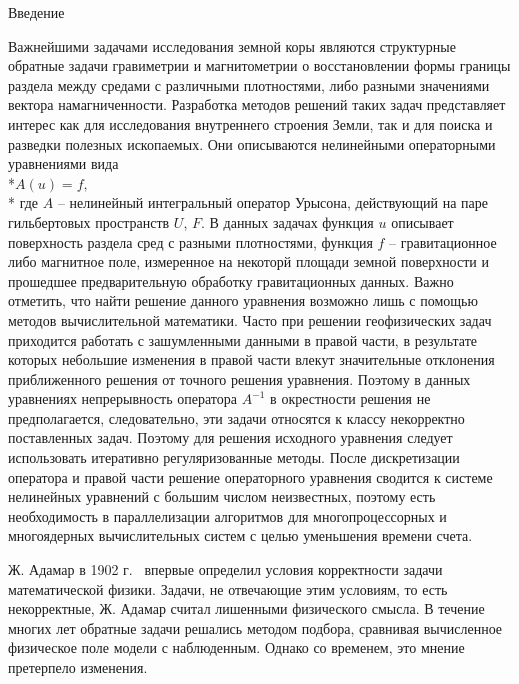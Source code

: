 \documentclass[14pt]{article}
\begin{document}
{\center Введение}

\Large
Важнейшими задачами исследования земной коры являются структурные обратные задачи гравиметрии и магнитометрии о восстановлении формы границы раздела между средами с различными плотностями, либо разными значениями вектора намагниченности. Разработка методов решений таких задач представляет интерес как для исследования внутреннего строения Земли, так и для поиска и разведки полезных ископаемых. Они описываются нелинейными операторными уравнениями вида
\\*\begin{math}A(u)=f, \end{math} \\* где $A$ -- нелинейный интегральный оператор Урысона, действующий на паре гильбертовых пространств $U$, $F$.  В данных задачах функция $u$ описывает поверхность раздела сред с разными плотностями, функция $f$ -- гравитационное либо магнитное поле, измеренное на некоторй площади земной поверхности и прошедшее предварительную обработку гравитационных данных. Важно отметить, что найти решение данного уравнения возможно лишь с помощью методов вычислительной математики. Часто при решении геофизических задач приходится работать с зашумленными данными в правой части, в результате которых небольшие изменения в правой части влекут значительные отклонения приближенного решения от точного решения уравнения. Поэтому в данных уравнениях непрерывность оператора $A^{-1}$ в окрестности решения не предполагается, следовательно, эти задачи относятся к классу некорректно поставленных задач. Поэтому для решения исходного уравнения следует использовать итеративно регуляризованные методы. После дискретизации оператора и правой части решение операторного уравнения сводится к системе нелинейных уравнений с большим числом неизвестных, поэтому есть необходимость в параллелизации алгоритмов для многопроцессорных и многоядерных вычислительных систем с целью уменьшения времени счета. 

Ж. Адамар в 1902 г.~\cite{Hadamar1902} впервые определил условия корректности задачи математической физики. Задачи, не отвечающие этим условиям, то есть некорректные,  Ж. Адамар считал лишенными физического смысла. В течение многих лет обратные задачи решались методом подбора, сравнивая вычисленное физическое поле модели с наблюденным. Однако со временем, это мнение претерпело изменения.
\end{document}

